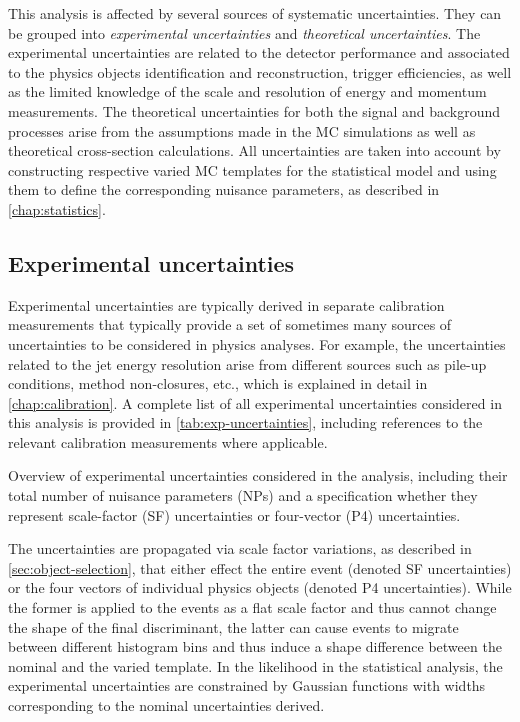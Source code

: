 This analysis is affected by several sources of systematic uncertainties.
They can be grouped into \emph{experimental uncertainties} and \emph{theoretical uncertainties}.
The experimental uncertainties are related to the detector performance and associated to the physics objects identification and reconstruction, trigger efficiencies, as well as the limited knowledge of the scale and resolution of energy and momentum measurements.
The theoretical uncertainties for both the signal and background processes arise from the assumptions made in the MC simulations as well as theoretical cross-section calculations. 
All uncertainties are taken into account by constructing respective varied MC templates for the statistical model and using them to define the corresponding nuisance parameters, as described in \cref{chap:statistics}.

\subsection{Experimental uncertainties}
Experimental uncertainties are typically derived in separate calibration measurements that typically provide a set of sometimes many sources of uncertainties to be considered in physics analyses.
For example, the uncertainties related to the jet energy resolution arise from different sources such as pile-up conditions, method non-closures, etc., which is explained in detail in \cref{chap:calibration}.
A complete list of all experimental uncertainties considered in this analysis is provided in \cref{tab:exp-uncertainties}, including references to the relevant calibration measurements where applicable.
\begin{table}[h!]
    \begin{center}
        
    \end{center}
    \caption[Overview of experimental uncertainties.]{Overview of experimental uncertainties considered in the \HWW analysis, including their total number of nuisance parameters (NPs) and a specification whether they represent scale-factor (SF) uncertainties or four-vector (P4) uncertainties.
    }
    \label{tab:exp-uncertainties}
\end{table}

The uncertainties are propagated via scale factor variations, as described in \cref{sec:object-selection}, that either effect the entire event (denoted SF uncertainties) or the four vectors of individual physics objects (denoted P4 uncertainties). 
While the former is applied to the events as a flat scale factor and thus cannot change the shape of the final discriminant, the latter can cause events to migrate between different histogram bins and thus induce a shape difference between the nominal and the varied template.
In the likelihood in the statistical analysis, the experimental uncertainties are constrained by Gaussian functions with widths corresponding to the nominal uncertainties derived.

